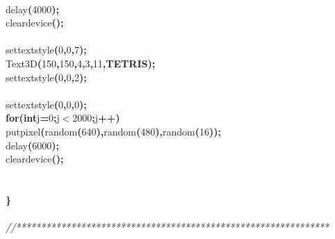 \documentclass[a4paper, 10pt]{article}
\newcommand\SPC{\hspace*{0.6em}}
\newcommand\QOT{\mbox{\char 34}}
\newcommand{\CppAComment}[1]{\textit{\textcolor[rgb]{0.2,0.6,1}{#1}}}
\newcommand{\CppAIdentifier}[1]{#1}
\newcommand{\CppANumber}[1]{\textcolor[rgb]{0.5,0,0.5}{#1}}
\newcommand{\CppAReservedWord}[1]{\textbf{#1}}
\newcommand{\CppASpace}[1]{\colorbox[rgb]{1,1,1}{#1}}
\newcommand{\CppAString}[1]{\textbf{\textcolor[rgb]{0,0,1}{#1}}}
\newcommand{\CppASymbol}[1]{\textbf{\textcolor[rgb]{1,0,0}{#1}}}
\begin{document}
\begin{ttfamily}
\\
\CppASpace{\SPC \SPC \SPC }\CppAIdentifier{delay}\CppASymbol{(}\CppANumber{4000}\CppASymbol{)}\CppASymbol{;}\\
\CppASpace{\SPC \SPC \SPC }\CppAIdentifier{cleardevice}\CppASymbol{(}\CppASymbol{)}\CppASymbol{;}\\
\\
\CppASpace{\SPC \SPC \SPC }\CppAIdentifier{settextstyle}\CppASymbol{(}\CppANumber{0}\CppASymbol{,}\CppANumber{0}\CppASymbol{,}\CppANumber{7}\CppASymbol{)}\CppASymbol{;}\\
\CppASpace{\SPC \SPC \SPC }\CppAIdentifier{Text3D}\CppASymbol{(}\CppANumber{150}\CppASymbol{,}\CppANumber{150}\CppASymbol{,}\CppANumber{4}\CppASymbol{,}\CppANumber{3}\CppASymbol{,}\CppANumber{11}\CppASymbol{,}\CppAString{\QOT TETRIS\QOT }\CppASymbol{)}\CppASymbol{;}\\
\CppASpace{\SPC \SPC \SPC }\CppAIdentifier{settextstyle}\CppASymbol{(}\CppANumber{0}\CppASymbol{,}\CppANumber{0}\CppASymbol{,}\CppANumber{2}\CppASymbol{)}\CppASymbol{;}\\
\\
\CppASpace{\SPC \SPC \SPC }\CppAIdentifier{settextstyle}\CppASymbol{(}\CppANumber{0}\CppASymbol{,}\CppANumber{0}\CppASymbol{,}\CppANumber{0}\CppASymbol{)}\CppASymbol{;}\\
\CppASpace{\SPC \SPC \SPC }\CppAReservedWord{for}\CppASymbol{(}\CppAReservedWord{int}\CppASpace{\SPC }\CppAIdentifier{j}\CppASymbol{=}\CppANumber{0}\CppASymbol{;}\CppAIdentifier{j}\CppASymbol{$<$}\CppANumber{2000}\CppASymbol{;}\CppAIdentifier{j}\CppASymbol{++}\CppASymbol{)}\\
\CppASpace{\SPC }\CppAIdentifier{putpixel}\CppASymbol{(}\CppAIdentifier{random}\CppASymbol{(}\CppANumber{640}\CppASymbol{)}\CppASymbol{,}\CppAIdentifier{random}\CppASymbol{(}\CppANumber{480}\CppASymbol{)}\CppASymbol{,}\CppAIdentifier{random}\CppASymbol{(}\CppANumber{16}\CppASymbol{)}\CppASymbol{)}\CppASymbol{;}\\
\CppASpace{\SPC \SPC \SPC }\CppAIdentifier{delay}\CppASymbol{(}\CppANumber{6000}\CppASymbol{)}\CppASymbol{;}\\
\CppASpace{\SPC \SPC \SPC }\CppAIdentifier{cleardevice}\CppASymbol{(}\CppASymbol{)}\CppASymbol{;}\\
\\
\\
\CppASymbol{\}}\\
\\
\CppAComment{//***************************************************************}\\

\end{ttfamily}
\end{document}
